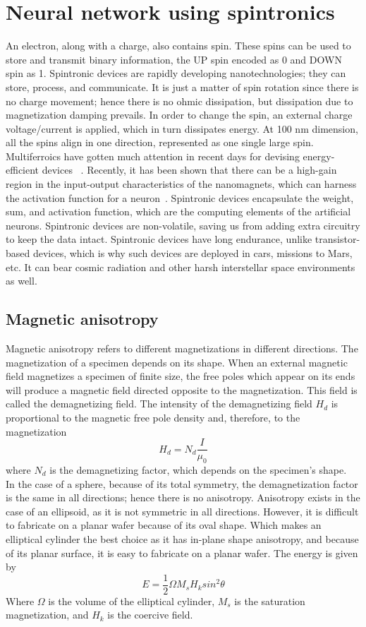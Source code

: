 \documentclass[12pt,a4paper,bold]{thesis}
\theoremstyle{thm}
\theoremstyle{definition}
\begin{document}
\section{Neural network using spintronics}
\indent \indent \indent An electron, along with a charge, also contains spin. These spins can be used to store and transmit binary information, the UP spin encoded as 0 and DOWN spin as 1. Spintronic devices are rapidly developing nanotechnologies; they can store, process, and communicate. It is just a matter of spin rotation since there is no charge movement; hence there is no ohmic dissipation, but dissipation due to magnetization damping prevails. In order to change the spin, an external charge voltage/current is applied, which in turn dissipates energy. At 100 nm dimension, all the spins align in one direction, represented as one single large spin.~\cite{hopfield1982neural, mead1989adaptive}\\
\indent \indent Multiferroics have gotten much attention in recent days for devising energy-efficient devices ~\cite{roy2017spintronics,roy2020energy}. Recently, it has been shown that there can be a high-gain region in the input-output characteristics of the nanomagnets, which can harness the activation function for a neuron~\cite{roy2017ultralow}. Spintronic devices encapsulate the weight, sum, and activation function, which are the computing elements of the artificial neurons. Spintronic devices are non-volatile, saving us from adding extra circuitry to keep the data intact. Spintronic devices have long endurance, unlike transistor-based devices, which is why such devices are deployed in cars, missions to Mars, etc. It can bear cosmic radiation and other harsh interstellar space environments as well.
\pagebreak
\subsection{Magnetic anisotropy}
\indent \indent \indent Magnetic anisotropy refers to different magnetizations in different directions. The magnetization of a specimen depends on its shape. When an external magnetic field magnetizes a specimen of finite size, the free poles which appear on its ends will produce a magnetic field directed opposite to the magnetization. This field is called the demagnetizing field. The intensity of the demagnetizing field $H_d$ is proportional to the magnetic free pole density and, therefore, to the magnetization
\[H_d=N_d\frac{I}{\mu_0}\]
where $N_d$ is the demagnetizing factor, which depends on the specimen's shape.\\
\indent \indent In the case of a sphere, because of its total symmetry, the demagnetization factor is the same in all directions; hence there is no anisotropy.
Anisotropy exists in the case of an ellipsoid, as it is not symmetric in all directions. However, it is difficult to fabricate on a planar wafer because of its oval shape.
Which makes an elliptical cylinder the best choice as it has in-plane shape anisotropy, and because of its planar surface, it is easy to fabricate on a planar wafer. The energy is given by 
\[E=\frac{1}{2}\Omega M_s H_k sin^2 \theta \] 
Where $\Omega$ is the volume of the elliptical cylinder, $M_s$ is the saturation magnetization, and $H_k$ is the coercive field.
\end{document}
